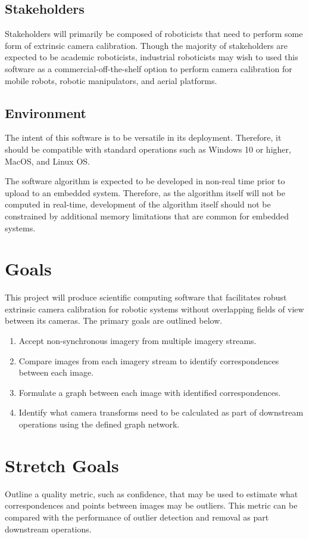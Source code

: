 \documentclass{article}
\begin{document}
\subsection{Stakeholders}
Stakeholders will primarily be composed of roboticists that need to perform some form of extrinsic camera calibration. 
Though the majority of stakeholders are expected to be academic roboticists, industrial roboticists may wish to used this software
as a commercial-off-the-shelf option to perform camera calibration for mobile robots, robotic manipulators, and aerial platforms.

\subsection{Environment}
The intent of this software is to be versatile in its deployment. Therefore, it should be compatible with standard operations 
such as Windows 10 or higher, MacOS, and Linux OS.

The software algorithm is expected to be developed in non-real time prior to upload to an embedded system. 
Therefore, as the algorithm itself will not be computed in real-time, development of the algorithm itself should not 
be constrained by additional memory limitations that are common for embedded systems.

\section{Goals}
This project will produce scientific computing software that facilitates robust extrinsic camera calibration for robotic systems without overlapping fields of view between its cameras. The primary goals are outlined below.
\begin{enumerate}
    \item Accept non-synchronous imagery from multiple imagery streams.
    \item Compare images from each imagery stream to identify correspondences between each image.
    \item Formulate a graph between each image with identified correspondences.
    \item Identify what camera transforms need to be calculated as part of downstream operations using the defined graph network.
\end{enumerate}

\section{Stretch Goals}
Outline a quality metric, such as confidence, that may be used to estimate what correspondences and points between images may be outliers. 
This metric can be compared with the performance of outlier detection and removal as part downstream operations.
\end{document}
